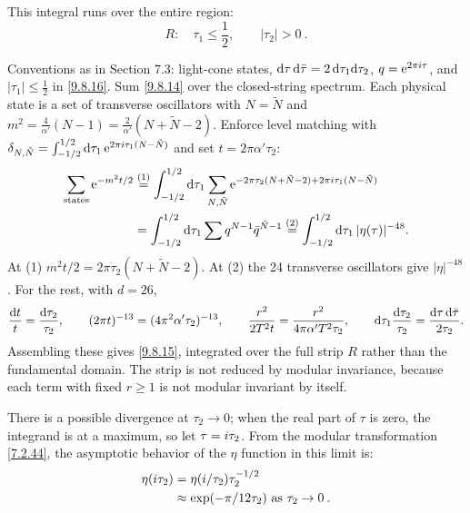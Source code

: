 This integral runs over the entire region:
\begin{equation}
	R: \quad \tau_{1} \leq \frac{1}{2}, \qquad |\tau_{2}|>0 \:. \label{9.8.16}
\end{equation}
\begin{tcolorbox}[breakable]
	\begin{remark}
		Conventions as in Section 7.3: light-cone states, $\mathrm{d}\tau\,\mathrm{d}\bar\tau=2\,\mathrm{d}\tau_1\mathrm{d}\tau_2$, $q=\mathrm{e}^{2\pi i\tau}$, and $|\tau_1|\le\frac12$ in \eqref{9.8.16}. Sum \eqref{9.8.14} over the closed-string spectrum. Each physical state is a set of transverse oscillators with $N=\tilde N$ and $m^2=\frac{4}{\alpha'}(N-1)=\frac{2}{\alpha'}(N+\tilde N-2)$. Enforce level matching with $\delta_{N,\tilde N}=\int_{-1/2}^{1/2}\mathrm{d}\tau_1\,\mathrm{e}^{2\pi i\tau_1(N-\tilde N)}$ and set $t=2\pi\alpha'\tau_2$:
		\begin{align*}
			\sum_{\text{states}}\mathrm{e}^{-m^2t/2}&\overset{(1)}{=}\int_{-1/2}^{1/2}\mathrm{d}\tau_1\sum_{N,\tilde N}\mathrm{e}^{-2\pi\tau_2(N+\tilde N-2)+2\pi i\tau_1(N-\tilde N)}\\
			&=\int_{-1/2}^{1/2}\mathrm{d}\tau_1\sum q^{N-1}\bar q^{\tilde N-1}\overset{(2)}{=}\int_{-1/2}^{1/2}\mathrm{d}\tau_1\,|\eta(\tau)|^{-48} .
		\end{align*}
		At (1) $m^2t/2=2\pi\tau_2(N+\tilde N-2)$. At (2) the 24 transverse oscillators give $|\eta|^{-48}$. For the rest, with $d=26$,
		\begin{equation*}
			\frac{\mathrm{d} t}{t}=\frac{\mathrm{d}\tau_2}{\tau_2},\qquad(2\pi t)^{-13}=(4\pi^2\alpha'\tau_2)^{-13},\qquad\frac{r^2}{2T^2t}=\frac{r^2}{4\pi\alpha'T^2\tau_2},\qquad\mathrm{d}\tau_1\frac{\mathrm{d}\tau_2}{\tau_2}=\frac{\mathrm{d}\tau\,\mathrm{d}\bar\tau}{2\tau_2} .
		\end{equation*}
		Assembling these gives \eqref{9.8.15}, integrated over the full strip $R$ rather than the fundamental domain. The strip is not reduced by modular invariance, because each term with fixed $r\ge1$ is not modular invariant by itself.
	\end{remark}
\end{tcolorbox}
There is a possible divergence at $\tau_{2} \rightarrow 0 $; when the real part of $\tau$ is zero, the integrand is at a maximum, so let $\tau=i \tau_{2}$.
From the modular transformation \eqref{7.2.44}, the asymptotic behavior of the $\eta$ function in this limit is:
\begin{align}
	\eta(i \tau_{2}) &= \eta(i / \tau_{2}) \tau_{2}^{-1/2} \nonumber \\
	& \approx \exp (-\pi / 12 \tau_{2}) \text { as } \tau_{2} \rightarrow 0 \:.
	\label{9.8.17}
\end{align}

